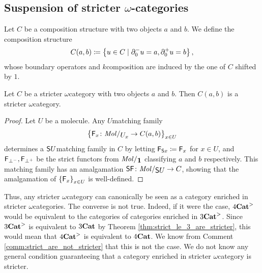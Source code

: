 \subsection{Suspension of stricter \texorpdfstring{$\omega$}{ω}-categories} \label{subsec:suspension}

\begin{dfn} 
    Let \( C \) be a composition structure with two objects \( a \) and \( b \).
    We define the composition structure
    \begin{equation*}
        C(a, b) \coloneqq \left\{ {u \in C \mid \partial_{0}^{-} u = a, \partial_{0}^{+} u = b} \right\},    
    \end{equation*}
    whose boundary operators and \( k \)\nbd composition are induced by the one of \( C \) shifted by \( 1 \).
\end{dfn}

\begin{lem} \label{lem:hom_of_stricter_is_stricter}
    Let \( C \) be a stricter \( \omega \)\nbd category with two objects \( a \) and \( b \).
    Then \( C(a, b) \) is a stricter \( \omega \)\nbd category.
\end{lem}
\begin{proof}
    Let \( U \) be a molecule.
    Any \( U \)\nbd matching family 
    \begin{equation*}
        \set{\F_x \colon \molecin{\imel{U}{x}} \to C(a, b)}_{x \in U}
    \end{equation*}
    determines a \( \mathsf{S}{U} \)\nbd matching family in \( C \) by letting \( \mathsf{F}_{\mathsf{S}{x}} \coloneqq \mathsf{F}_x \) for \( x \in U \), and \( \mathsf{F}_{\bot^-}, \mathsf{F}_{\bot^+} \) be the strict functors from \( \molecin{\pt} \) classifying \( a \) and \( b \) respectively. 
    This matching family has an amalgamation \( \sus{\F} \colon \molecin{\sus{U}} \to C \), showing that the amalgamation of \( \left\{ {\mathsf{F}_x} \right\}_{x \in U} \) is well-defined.
\end{proof}

\begin{comm}
    Thus, any stricter \( \omega \)\nbd category can canonically be seen as a category enriched in stricter \( \omega \)\nbd categories.
    The converse is not true. 
    Indeed, if it were the case, \( {4\mathbf{Cat}}^> \) would be equivalent to the categories of categories enriched in \( {3\mathbf{Cat}}^> \).
    Since \( {3\mathbf{Cat}}^> \) is equivalent to \( {3\mathbf{Cat}} \) by Theorem \ref{thm:strict_le_3_are_stricter}, this would mean that \( {4\mathbf{Cat}}^> \) is equivalent to \( {4\mathbf{Cat}} \).
    We know from Comment \ref{comm:strict_are_not_stricter} that this is not the case.
    We do not know any general condition guaranteeing that a category enriched in stricter \( \omega \)\nbd category is stricter.
\end{comm}

